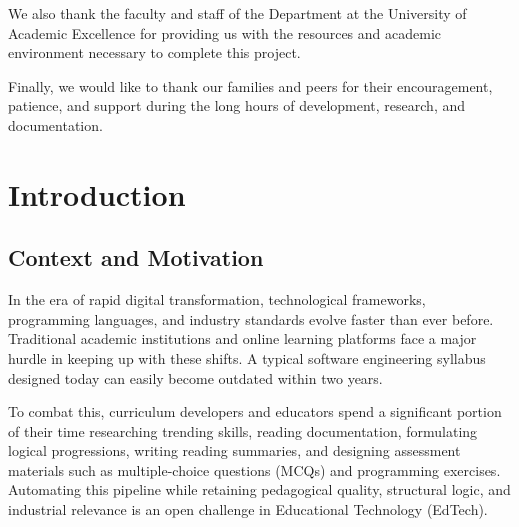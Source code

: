 \documentclass[12pt,a4paper]{report}
\begin{document}
We also thank the faculty and staff of the Department  at the University of Academic Excellence for providing us with the resources and academic environment necessary to complete this project. 

Finally, we would like to thank our families and peers for their encouragement, patience, and support during the long hours of development, research, and documentation.

\tableofcontents

\listoftables

\chapter{Introduction}
\label{ch:introduction}

\section{Context and Motivation}
In the era of rapid digital transformation, technological frameworks, programming languages, and industry standards evolve faster than ever before. Traditional academic institutions and online learning platforms face a major hurdle in keeping up with these shifts. A typical software engineering syllabus designed today can easily become outdated within two years.

To combat this, curriculum developers and educators spend a significant portion of their time researching trending skills, reading documentation, formulating logical progressions, writing reading summaries, and designing assessment materials such as multiple-choice questions (MCQs) and programming exercises. Automating this pipeline while retaining pedagogical quality, structural logic, and industrial relevance is an open challenge in Educational Technology (EdTech).
\end{document}
